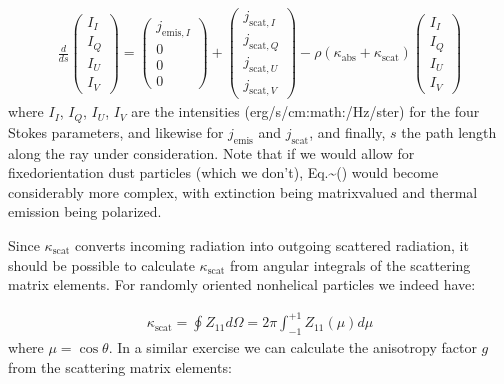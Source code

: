 \documentclass[letterpaper,10pt,english]{sphinxmanual}
\begin{document}
\label{\detokenize{dustradtrans:eq-radtrans-randomorient}}\begin{equation*}
\begin{split}\frac{d}{ds}\left(
\begin{matrix}
I_I\\I_Q\\I_U\\I_V
\end{matrix}
\right)
=
\left(
\begin{matrix}
j_{\mathrm{emis},I}\\0\\0\\0
\end{matrix}
\right)
+
\left(
\begin{matrix}
j_{\mathrm{scat},I}\\j_{\mathrm{scat},Q}\\j_{\mathrm{scat},U}\\j_{\mathrm{scat},V}
\end{matrix}
\right)
-\rho(\kappa_{\mathrm{abs}}+\kappa_{\mathrm{scat}})
\left(
\begin{matrix}
I_I\\I_Q\\I_U\\I_V
\end{matrix}
\right)\end{split}
\end{equation*}
where \(I_I\), \(I_Q\), \(I_U\), \(I_V\) are the intensities
(erg/s/cm:math:/Hz/ster) for the four Stokes parameters, and likewise for
\(j_{\mathrm{emis}}\) and \(j_{\mathrm{scat}}\), and finally, \(s\)
the path length along the ray under consideration. Note that if we would allow
for fixed\sphinxhyphen{}orientation dust particles (which we don’t),
Eq.\textasciitilde{}() would become considerably more complex,
with extinction being matrix\sphinxhyphen{}valued and thermal emission being polarized.

Since \(\kappa_{\mathrm{scat}}\) converts incoming radiation into outgoing
scattered radiation, it should be possible to calculate
\(\kappa_{\mathrm{scat}}\) from angular integrals of the scattering matrix
elements. For randomly oriented non\sphinxhyphen{}helical particles we indeed have:

\label{\detokenize{dustradtrans:eq-scatmat-selfconsist-kappa}}\begin{equation*}
\begin{split}\kappa_{\mathrm{scat}} = \oint Z_{11} d\Omega =
2\pi \int_{-1}^{+1}Z_{11}(\mu)d\mu\end{split}
\end{equation*}
where \(\mu=\cos\theta\). In a similar exercise we can calculate the
anisotropy factor \(g\) from the scattering matrix elements:
\end{document}
